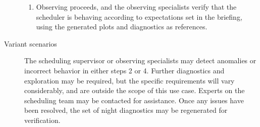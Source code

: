 \begin{description}
\begin{enumerate}
\item Observing proceeds, and the observing specialists verify that the scheduler is behaving according to expectations set in the briefing, using the generated plots and diagnostics as references.
\end{enumerate}
\item[{Variant scenarios}] The scheduling supervisor or observing specialists may detect anomalies or incorrect behavior in either steps 2 or 4. Further diagnostics and exploration may be required, but the specific requirements will vary considerably, and are outside the scope of this use case. Experts on the scheduling team may be contacted for assistance. Once any issues have been resolved, the set of night diagnostics may be regenerated for verification.
\end{description}

